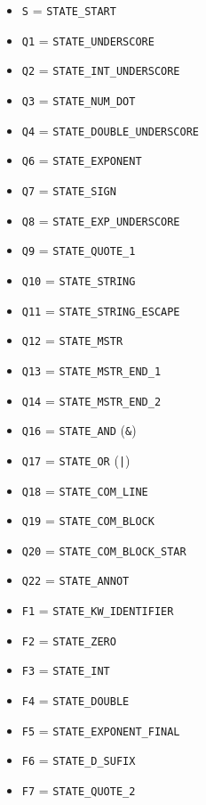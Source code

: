 \documentclass[]{ifjclass}
\begin{document}
        \begin{minipage}[t]{0.49\textwidth}
        \footnotesize
        \begin{itemize}\setlength{\itemsep}{1pt}\setlength{\parskip}{0pt}
            \item \texttt{S} = \texttt{STATE\_START}
            \item \texttt{Q1} = \texttt{STATE\_UNDERSCORE}
            \item \texttt{Q2} = \texttt{STATE\_INT\_UNDERSCORE}
            \item \texttt{Q3} = \texttt{STATE\_NUM\_DOT}
            \item \texttt{Q4} = \texttt{STATE\_DOUBLE\_UNDERSCORE}
            \item \texttt{Q6} = \texttt{STATE\_EXPONENT}
            \item \texttt{Q7} = \texttt{STATE\_SIGN}
            \item \texttt{Q8} = \texttt{STATE\_EXP\_UNDERSCORE}
            \item \texttt{Q9} = \texttt{STATE\_QUOTE\_1}
            \item \texttt{Q10} = \texttt{STATE\_STRING}
            \item \texttt{Q11} = \texttt{STATE\_STRING\_ESCAPE}
            \item \texttt{Q12} = \texttt{STATE\_MSTR}
            \item \texttt{Q13} = \texttt{STATE\_MSTR\_END\_1}
            \item \texttt{Q14} = \texttt{STATE\_MSTR\_END\_2}
            \item \texttt{Q16} = \texttt{STATE\_AND} (\texttt{\&})
            \item \texttt{Q17} = \texttt{STATE\_OR} (\texttt{|})
            \item \texttt{Q18} = \texttt{STATE\_COM\_LINE}
            \item \texttt{Q19} = \texttt{STATE\_COM\_BLOCK}
            \item \texttt{Q20} = \texttt{STATE\_COM\_BLOCK\_STAR}
            \item \texttt{Q22} = \texttt{STATE\_ANNOT}
            \item \texttt{F1} = \texttt{STATE\_KW\_IDENTIFIER}
            \item \texttt{F2} = \texttt{STATE\_ZERO}
            \item \texttt{F3} = \texttt{STATE\_INT}
            \item \texttt{F4} = \texttt{STATE\_DOUBLE}
            \item \texttt{F5} = \texttt{STATE\_EXPONENT\_FINAL}
            \item \texttt{F6} = \texttt{STATE\_D\_SUFIX}
            \item \texttt{F7} = \texttt{STATE\_QUOTE\_2}
        \end{itemize}
        \end{minipage}%
\end{document}
